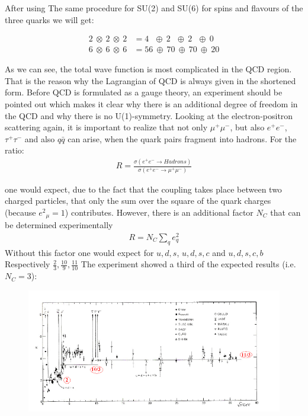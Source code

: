 After using The same procedure for SU(2) and SU(6) for spins and flavours of the three quarks we will get:

\begin{equation}
\begin{split}
2\: \otimes\:2 \:\otimes\:2 &= 4 \:\:\:\oplus\: 2\:\:\:\oplus\:2\:\:\:\oplus\:0\\
6\: \otimes\:6 \:\otimes\:6&= 56 \:\oplus\: 70\:\oplus\:70\:\oplus\:20
\end{split}
\end{equation}

As we can see, the total wave function is most complicated in the QCD region. That is the reason why the Lagrangian of QCD is always given in the shortened form. 
Before QCD is formulated as a gauge theory, an experiment should be pointed out which makes it clear why there is an additional degree of freedom in the QCD and why there is no
U(1)-symmetry. Looking at the electron-positron scattering again, it is important to realize that not only $ \mu^+ \mu^- $, but also $ e^+ e^- $,$ \tau^+ \tau^- $ and also $ q \bar{q} $ can arise, when the quark pairs fragment into hadrons. For the ratio:
\begin{equation}
\begin{split}
R = \frac{\sigma(e^+e^- \rightarrow Hadrons)}{\sigma(e^+e^- \rightarrow \mu^+ \mu^-)}
\end{split}
\end{equation}

one would expect, due to the fact that the coupling takes place between two charged particles, that only the sum over the square of the quark charges (because $  {e^2}_\mu= 1$) contributes. However, there is an additional factor $N_C$ that can be determined experimentally
\begin{equation}
\begin{split}
R = N_C \sum_q e^2_q
\end{split}
\end{equation}
Without this factor one would expect for $ u, d, s $, $ u, d, s, c $ and $ u, d, s, c, b $ Respectively $ \frac{2}{3}, \frac{10}{9}, \frac{11}{10} $ The experiment showed a third of the expected results (i.e. $ N_C =3 $):

\begin{figure}[h!]
\centering
\includegraphics[scale=0.6]{images/Intro/Ratio.png}
\cite{Eva}
\end{figure}
\pagebreak
